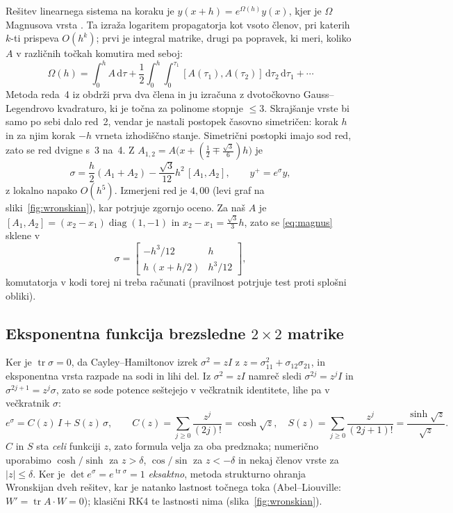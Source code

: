 \documentclass[11pt,a4paper]{article}
\begin{document}
Rešitev linearnega sistema na koraku je $y(x+h) = e^{\Omega(h)} y(x)$, kjer je
$\Omega$ Magnusova vrsta \cite{blanes}. Ta izraža logaritem propagatorja kot
vsoto členov, pri katerih $k$-ti prispeva $O(h^k)$; prvi je integral matrike,
drugi pa popravek, ki meri, koliko $A$ v različnih točkah komutira med seboj:
\begin{equation}
  \Omega(h) = \int_0^h A\,\mathrm d\tau
  + \frac12 \int_0^h\!\!\int_0^{\tau_1} [A(\tau_1), A(\tau_2)]\,
    \mathrm d\tau_2\,\mathrm d\tau_1 + \cdots
\end{equation}
Metoda reda~4 iz \cite{skripta} obdrži prva dva člena in ju izračuna z
dvotočkovno Gauss--Legendrovo kvadraturo, ki je točna za polinome stopnje
$\le 3$. Skrajšanje vrste bi samo po sebi dalo red~2, vendar je nastali
postopek časovno simetričen: korak $h$ in za njim korak $-h$ vrneta izhodiščno
stanje. Simetrični postopki imajo sod red, zato se red dvigne s~3 na~4.
Z $A_{1,2} = A\bigl(x + (\tfrac12 \mp \tfrac{\sqrt3}{6})h\bigr)$ je
\begin{equation}
  \sigma = \frac h2 (A_1 + A_2) - \frac{\sqrt3}{12} h^2\, [A_1, A_2],
  \qquad y^+ = e^{\sigma} y,
  \label{eq:magnus}
\end{equation}
z lokalno napako $O(h^5)$. 
Izmerjeni red je $4{,}00$ (levi graf na sliki~\ref{fig:wronskian}), kar potrjuje
zgornjo oceno.
Za naš $A$ je $[A_1, A_2] = (x_2 - x_1)
\operatorname{diag}(1, -1)$ in $x_2 - x_1 = \tfrac{\sqrt3}{3}h$, zato se
\eqref{eq:magnus} sklene v
\begin{equation}
  \sigma = \begin{bmatrix} -h^3/12 & h \\ h\,(x + h/2) & h^3/12 \end{bmatrix},
\end{equation}
komutatorja v kodi torej ni treba računati (pravilnost potrjuje test proti
splošni obliki).

\subsection{Eksponentna funkcija brezsledne $2\times 2$ matrike}

Ker je $\operatorname{tr}\sigma = 0$, da Cayley--Hamiltonov izrek
$\sigma^2 = zI$ z $z = \sigma_{11}^2 + \sigma_{12}\sigma_{21}$, in
eksponentna vrsta razpade na sodi in lihi del. Iz $\sigma^2 = zI$ namreč sledi
$\sigma^{2j} = z^j I$ in $\sigma^{2j+1} = z^j \sigma$, zato se sode potence
seštejejo v večkratnik identitete, lihe pa v večkratnik $\sigma$:
\begin{equation}
  e^{\sigma} = C(z)\,I + S(z)\,\sigma, \qquad
  C(z) = \sum_{j\ge 0} \frac{z^j}{(2j)!} = \cosh\sqrt z, \quad
  S(z) = \sum_{j\ge 0} \frac{z^j}{(2j+1)!} = \frac{\sinh\sqrt z}{\sqrt z}.
\end{equation}
$C$ in $S$ sta \emph{celi} funkciji $z$, zato formula velja za oba predznaka;
numerično uporabimo $\cosh/\sinh$ za $z > \delta$, $\cos/\sin$ za
$z < -\delta$ in nekaj členov vrste za $|z| \le \delta$. Ker je
$\det e^{\sigma} = e^{\operatorname{tr}\sigma} = 1$ \emph{eksaktno}, metoda
strukturno ohranja Wronskijan dveh rešitev, kar je natanko lastnost točnega
toka (Abel--Liouville: $W' = \operatorname{tr}A \cdot W = 0$); klasični RK4 te
lastnosti nima (slika~\ref{fig:wronskian}).
\end{document}
